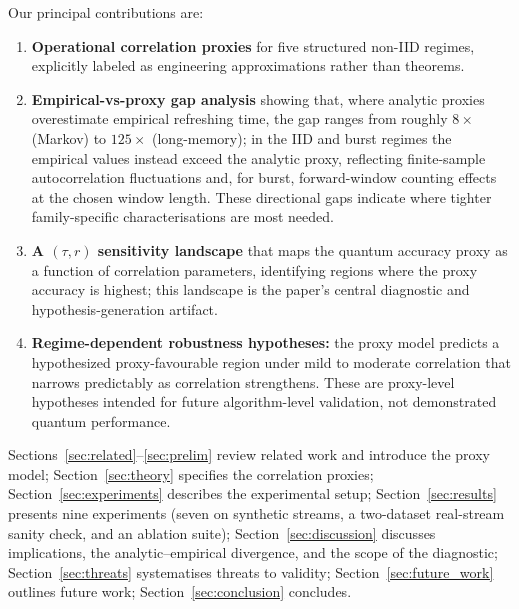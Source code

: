 \documentclass[sensors,article,submit,pdftex,moreauthors]{Definitions/mdpi}
\providecommand{\DIFadd}[1]{{\protect\color{blue}#1}} %
\providecommand{\DIFdel}[1]{} %
\providecommand{\DIFaddbegin}{} %
\providecommand{\DIFaddend}{} %
\providecommand{\DIFdelbegin}{} %
\providecommand{\DIFdelend}{} %
\begin{document}
Our principal contributions are:

\begin{enumerate}
    \item \textbf{Operational correlation proxies} for five structured non\nobreakdash-IID regimes, explicitly labeled as engineering approximations rather than theorems.

    \item \textbf{Empirical-vs-proxy gap analysis} showing that, where analytic proxies overestimate empirical refreshing time, the gap ranges from roughly $8\times$ (Markov) to $125\times$ (long-memory); in the IID and burst regimes the empirical values instead exceed the analytic proxy, reflecting finite\nobreakdash-sample autocorrelation fluctuations and, for burst, forward\nobreakdash-window counting effects at the chosen window length. These directional gaps indicate where tighter family-specific characterisations are most needed.

    \item \textbf{A $(\tau, r)$ sensitivity landscape} that maps the quantum accuracy proxy as a function of correlation parameters, identifying regions where the proxy accuracy is highest\DIFdelbegin \DIFdel{and which can serve as a diagnostic map for proxy-side sensitivity analysis}\DIFdelend \DIFaddbegin \DIFadd{; this landscape is the paper's central diagnostic and hypothesis-generation artifact}\DIFaddend .

    \item \textbf{Regime-dependent robustness \DIFdelbegin \DIFdel{trends}\DIFdelend \DIFaddbegin \DIFadd{hypotheses}\DIFaddend :} the proxy model \DIFdelbegin \DIFdel{suggests a favourable }\DIFdelend \DIFaddbegin \DIFadd{predicts a hypothesized proxy-favourable }\DIFaddend region under mild to moderate correlation that narrows predictably as correlation strengthens. \DIFaddbegin \DIFadd{These are proxy-level hypotheses intended for future algorithm-level validation, not demonstrated quantum performance.
}\DIFaddend \end{enumerate}

Sections~\ref{sec:related}--\ref{sec:prelim} review related work and introduce the proxy model; Section~\ref{sec:theory} specifies the correlation proxies; Section~\ref{sec:experiments} describes the experimental setup; Section~\ref{sec:results} presents nine experiments (seven on synthetic streams, a two\nobreakdash-dataset real-stream sanity check, and an ablation suite); Section~\ref{sec:discussion} discusses implications\DIFdelbegin \DIFdel{and limitations}\DIFdelend \DIFaddbegin \DIFadd{, the analytic--empirical divergence, and the scope of the diagnostic}\DIFaddend ; Section~\DIFaddbegin \DIFadd{\ref{sec:threats} systematises threats to validity; Section~\ref{sec:future_work} outlines future work; Section~}\DIFaddend \ref{sec:conclusion} concludes.
\end{document}
